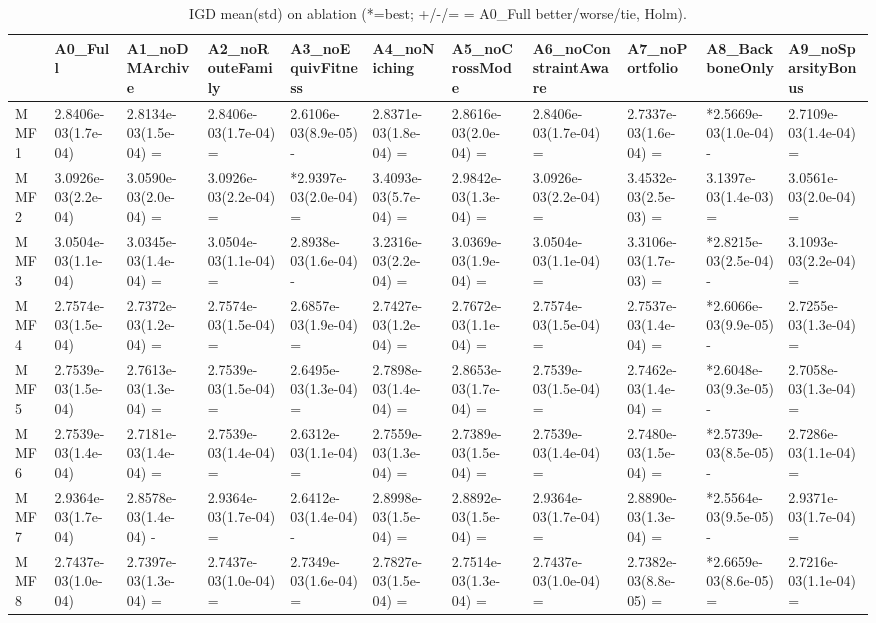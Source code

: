 \begin{table}[t]
\centering
\caption{IGD mean(std) on ablation (*=best; +/-/= = A0_Full better/worse/tie, Holm).}
\label{tab:ablation_IGD}
\begin{tabular}{lllllllllll}
\toprule
 & A0\_Full & A1\_noDMArchive & A2\_noRouteFamily & A3\_noEquivFitness & A4\_noNiching & A5\_noCrossMode & A6\_noConstraintAware & A7\_noPortfolio & A8\_BackboneOnly & A9\_noSparsityBonus \\
\midrule
MMF1 & 2.8406e-03(1.7e-04) & 2.8134e-03(1.5e-04) = & 2.8406e-03(1.7e-04) = & 2.6106e-03(8.9e-05) - & 2.8371e-03(1.8e-04) = & 2.8616e-03(2.0e-04) = & 2.8406e-03(1.7e-04) = & 2.7337e-03(1.6e-04) = & *2.5669e-03(1.0e-04) - & 2.7109e-03(1.4e-04) = \\
MMF2 & 3.0926e-03(2.2e-04) & 3.0590e-03(2.0e-04) = & 3.0926e-03(2.2e-04) = & *2.9397e-03(2.0e-04) = & 3.4093e-03(5.7e-04) = & 2.9842e-03(1.3e-04) = & 3.0926e-03(2.2e-04) = & 3.4532e-03(2.5e-03) = & 3.1397e-03(1.4e-03) = & 3.0561e-03(2.0e-04) = \\
MMF3 & 3.0504e-03(1.1e-04) & 3.0345e-03(1.4e-04) = & 3.0504e-03(1.1e-04) = & 2.8938e-03(1.6e-04) - & 3.2316e-03(2.2e-04) = & 3.0369e-03(1.9e-04) = & 3.0504e-03(1.1e-04) = & 3.3106e-03(1.7e-03) = & *2.8215e-03(2.5e-04) - & 3.1093e-03(2.2e-04) = \\
MMF4 & 2.7574e-03(1.5e-04) & 2.7372e-03(1.2e-04) = & 2.7574e-03(1.5e-04) = & 2.6857e-03(1.9e-04) = & 2.7427e-03(1.2e-04) = & 2.7672e-03(1.1e-04) = & 2.7574e-03(1.5e-04) = & 2.7537e-03(1.4e-04) = & *2.6066e-03(9.9e-05) - & 2.7255e-03(1.3e-04) = \\
MMF5 & 2.7539e-03(1.5e-04) & 2.7613e-03(1.3e-04) = & 2.7539e-03(1.5e-04) = & 2.6495e-03(1.3e-04) = & 2.7898e-03(1.4e-04) = & 2.8653e-03(1.7e-04) = & 2.7539e-03(1.5e-04) = & 2.7462e-03(1.4e-04) = & *2.6048e-03(9.3e-05) - & 2.7058e-03(1.3e-04) = \\
MMF6 & 2.7539e-03(1.4e-04) & 2.7181e-03(1.4e-04) = & 2.7539e-03(1.4e-04) = & 2.6312e-03(1.1e-04) = & 2.7559e-03(1.3e-04) = & 2.7389e-03(1.5e-04) = & 2.7539e-03(1.4e-04) = & 2.7480e-03(1.5e-04) = & *2.5739e-03(8.5e-05) - & 2.7286e-03(1.1e-04) = \\
MMF7 & 2.9364e-03(1.7e-04) & 2.8578e-03(1.4e-04) - & 2.9364e-03(1.7e-04) = & 2.6412e-03(1.4e-04) - & 2.8998e-03(1.5e-04) = & 2.8892e-03(1.5e-04) = & 2.9364e-03(1.7e-04) = & 2.8890e-03(1.3e-04) = & *2.5564e-03(9.5e-05) - & 2.9371e-03(1.7e-04) = \\
MMF8 & 2.7437e-03(1.0e-04) & 2.7397e-03(1.3e-04) = & 2.7437e-03(1.0e-04) = & 2.7349e-03(1.6e-04) = & 2.7827e-03(1.5e-04) = & 2.7514e-03(1.3e-04) = & 2.7437e-03(1.0e-04) = & 2.7382e-03(8.8e-05) = & *2.6659e-03(8.6e-05) = & 2.7216e-03(1.1e-04) = \\
\bottomrule
\end{tabular}
\end{table}
